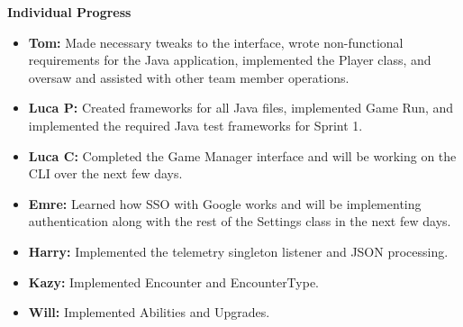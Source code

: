 \documentclass[11pt]{article}
\begin{document}
    \textbf{Individual Progress}
    \begin{itemize}
        \item \textbf{Tom:} Made necessary tweaks to the interface, wrote non-functional requirements for the Java application, implemented the Player class, and oversaw and assisted with other team member operations.

        \item \textbf{Luca P:} Created frameworks for all Java files, implemented Game Run, and implemented the required Java test frameworks for Sprint 1.

        \item \textbf{Luca C:} Completed the Game Manager interface and will be working on the CLI over the next few days.

        \item \textbf{Emre:} Learned how SSO with Google works and will be implementing authentication along with the rest of the Settings class in the next few days.

        \item \textbf{Harry:} Implemented the telemetry singleton listener and JSON processing.

        \item \textbf{Kazy:} Implemented Encounter and EncounterType.

        \item \textbf{Will:} Implemented Abilities and Upgrades.
    \end{itemize}
\end{document}
